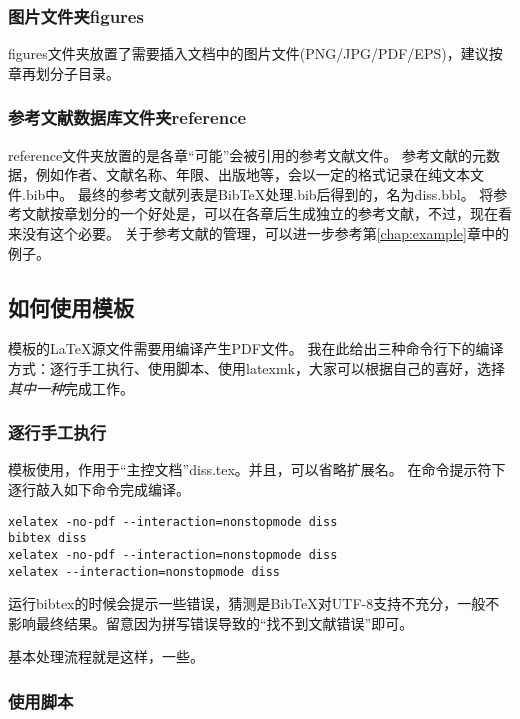 \subsubsection{图片文件夹figures}
\label{sec:figuresdir}

figures文件夹放置了需要插入文档中的图片文件(PNG/JPG/PDF/EPS)，建议按章再划分子目录。

\subsubsection{参考文献数据库文件夹reference}
\label{sec:bibdir}

reference文件夹放置的是各章``可能''会被引用的参考文献文件。
参考文献的元数据，例如作者、文献名称、年限、出版地等，会以一定的格式记录在纯文本文件.bib中。
最终的参考文献列表是BibTeX处理.bib后得到的，名为diss.bbl。
将参考文献按章划分的一个好处是，可以在各章后生成独立的参考文献，不过，现在看来没有这个必要。
关于参考文献的管理，可以进一步参考第\ref{chap:example}章中的例子。

\subsection{如何使用模板}
\label{sec:process}

模板的\LaTeX{}源文件需要用\XeTeX{}编译产生PDF文件。
我在此给出三种命令行下的编译方式：逐行手工执行、使用脚本、使用latexmk，大家可以根据自己的喜好，选择\emph{其中一种}完成工作。

\subsubsection{逐行手工执行}

模板使用，作用于“主控文档”diss.tex。并且，可以省略扩展名。
在命令提示符下逐行敲入如下命令完成编译。

\begin{lstlisting}[basicstyle=\small\ttfamily, caption={手动执行编译过程}, numbers=none]
xelatex -no-pdf --interaction=nonstopmode diss
bibtex diss 
xelatex -no-pdf --interaction=nonstopmode diss 
xelatex --interaction=nonstopmode diss 
\end{lstlisting}

运行bibtex的时候会提示一些错误，猜测是{{\sc Bib}\TeX}对UTF-8支持不充分，一般不影响最终结果。留意因为拼写错误导致的``找不到文献错误''即可。

基本处理流程就是这样，一些。

\subsubsection{使用脚本}

